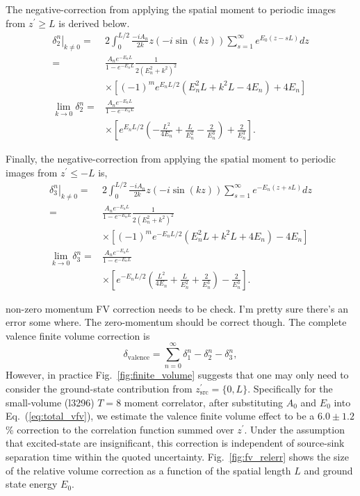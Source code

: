 \documentclass[prd,aps,twocolumn,superscriptaddress,tightenlines,nofootinbib,floatfix,preprintnumbers,10pt]{revtex4-1}
\begin{document}
The negative-correction from applying the spatial moment to periodic images from $z^\prime \geq L$ is derived below. 
\begin{align}
\left.\delta^n_{2}\right|_{k\neq 0} =& 2\int_0^{L/2} \frac{-iA_n}{2k}z(-i\sin(kz)) \sum_{s=1}^\infty e^{E_0(z-sL)} dz \label{eq:dfv_2.1}\\
= & \frac{A_n e^{-E_n L}}{1-e^{-E_n L}}\frac{1}{2(E_n^2+k^2)^2}\nonumber\\
&\times\left[(-1)^m e^{E_n L/2}(E_n^2L+k^2L-4E_n) + 4E_n\right]\label{eq:dfv_2.2}\\
\lim_{k\rightarrow 0}\delta^n_2= & \frac{A_n e^{-E_n L}}{1-e^{-E_n L}}\nonumber\\
&\times\left[e^{E_n L/2} \left( -\frac{L^2}{4E_n} + \frac{L}{E_n^2} -\frac{2}{E_n^3} \right) + \frac{2}{E_n^3}\right].
\label{eq:dfv_2.0}
\end{align}

Finally, the negative-correction from applying the spatial moment to periodic images from $z^\prime \leq -L$ is,
\begin{align}
\left.\delta^n_{3}\right|_{k\neq 0}= & 2\int_{0}^{L/2}  \frac{-iA_n}{2k} z (-i\sin(kz)) \sum_{s=1}^\infty e^{-E_n(z+sL)} dz \label{eq:dfv_3.1}\\
=&\frac{A_n e^{-E_n L}}{1-e^{-E_n L}}\frac{1}{2(E_n^2+k^2)^2}\nonumber\\
&\times\left[(-1)^m e^{-E_n L/2}(E_n^2L+k^2L+4E_n) - 4E_n\right]\\
\lim_{k\rightarrow 0} \delta^n_3= & \frac{A_n e^{-E_n L}}{1-e^{-E_n L}}\nonumber\\
&\times \left[ e^{-E_n L/2}\left(\frac{L^2}{4E_n}+\frac{L}{E_n^2}+\frac{2}{E_n^3}\right)-\frac{2}{E_n^3}\right].
\label{eq:dfv_3.0}
\end{align}

{\color{red} non-zero momentum FV correction needs to be check. I'm pretty sure there's an error some where. The zero-momentum should be correct though.} The complete valence finite volume correction is
\begin{equation}
\delta_{\mathrm{valence}} = \sum_{n=0}^\infty \delta^n_1 - \delta^n_2 - \delta^n_3,
\label{eq:total_vfv}
\end{equation}
However, in practice Fig.~\ref{fig:finite_volume} suggests that one may only need to consider the ground-state contribution from $z^\prime_{\mathrm{src}}=\{0, L\}$. Specifically for the small-volume (l3296) $T=8$ moment correlator, after substituting $A_0$ and $E_0$ into Eq.~(\ref{eq:total_vfv}), we estimate the valence finite volume effect to be a $6.0\pm 1.2$\% correction to the correlation function summed over $z^\prime$. Under the assumption that excited-state are insignificant, this correction is independent of source-sink separation time within the quoted uncertainty. Fig.~\ref{fig:fv_relerr} shows the size of the relative volume correction as a function of the spatial length $L$ and ground state energy $E_0$.
\end{document}
